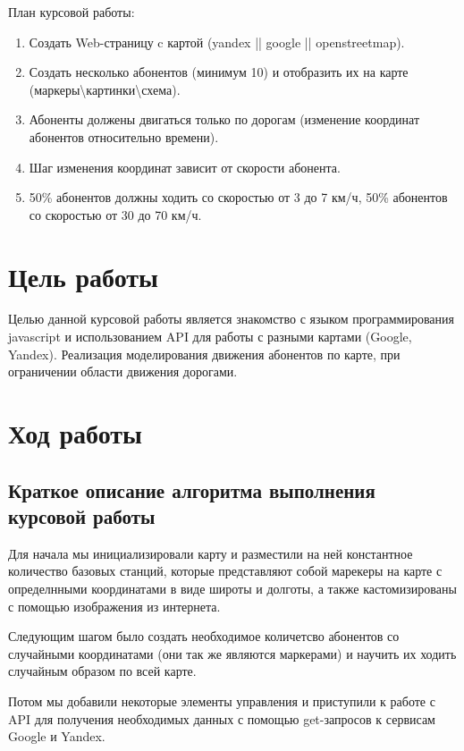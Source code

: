\documentclass[a4paper]{article}
\begin{document}
\begin{onehalfspacing}
План курсовой работы:
\begin{enumerate}
	\item Создать Web-страницу c картой (yandex || google || openstreetmap).

	\item Создать несколько абонентов (минимум 10) и отобразить их на карте (маркеры\textbackslash картинки\textbackslash схема).

	\item Абоненты должены двигаться только по дорогам (изменение координат абонентов относительно времени).

	\item Шаг изменения координат зависит от скорости абонента.

	\item 50\% абонентов должны ходить со скоростью от 3 до 7 км/ч, 50\% абонентов со скоростью от 30 до 70 км/ч.
\end{enumerate}


\section{Цель работы}

\tab Целью данной курсовой работы является знакомство с языком программирования javascript и использованием API для работы с разными картами (Google, Yandex). Реализация моделирования движения абонентов по карте, при ограничении области движения дорогами. 

\clearpage
\section{Ход работы}
\subsection{Краткое описание алгоритма выполнения курсовой работы}

\tab Для начала мы инициализировали карту и разместили на ней константное количество базовых станций, которые представляют собой марекеры на карте с определнными координатами в виде широты и долготы, а также кастомизированы с помощью изображения из интернета.

Следующим шагом было создать необходимое количетсво абонентов со случайными координатами (они так же являются маркерами) и научить их ходить случайным образом по всей карте.

Потом мы добавили некоторые элементы управления и приступили к работе с API для получения необходимых данных с помощью get-запросов к сервисам Google и Yandex. 


\end{onehalfspacing}
\end{document}
